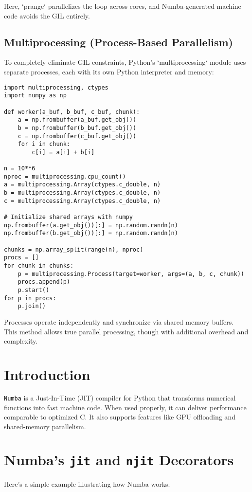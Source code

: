 \documentclass{book}
\begin{document}
Here, `prange` parallelizes the loop across cores, and Numba-generated machine code avoids the GIL entirely.

\subsection{Multiprocessing (Process-Based Parallelism)}

To completely eliminate GIL constraints, Python's `multiprocessing` module uses separate processes, each with its own Python interpreter and memory:

\begin{lstlisting}
import multiprocessing, ctypes
import numpy as np

def worker(a_buf, b_buf, c_buf, chunk):
    a = np.frombuffer(a_buf.get_obj())
    b = np.frombuffer(b_buf.get_obj())
    c = np.frombuffer(c_buf.get_obj())
    for i in chunk:
        c[i] = a[i] + b[i]

n = 10**6
nproc = multiprocessing.cpu_count()
a = multiprocessing.Array(ctypes.c_double, n)
b = multiprocessing.Array(ctypes.c_double, n)
c = multiprocessing.Array(ctypes.c_double, n)

# Initialize shared arrays with numpy
np.frombuffer(a.get_obj())[:] = np.random.randn(n)
np.frombuffer(b.get_obj())[:] = np.random.randn(n)

chunks = np.array_split(range(n), nproc)
procs = []
for chunk in chunks:
    p = multiprocessing.Process(target=worker, args=(a, b, c, chunk))
    procs.append(p)
    p.start()
for p in procs:
    p.join()
\end{lstlisting}

Processes operate independently and synchronize via shared memory buffers. This method allows true parallel processing, though with additional overhead and complexity.

\pagebreak

\section*{Introduction}
\texttt{Numba} is a Just-In-Time (JIT) compiler for Python that transforms numerical functions into fast machine code. When used properly, it can deliver performance comparable to optimized C. It also supports features like GPU offloading and shared-memory parallelism.

\section{Numba’s \texttt{jit} and \texttt{njit} Decorators}
Here’s a simple example illustrating how Numba works:
\end{document}
